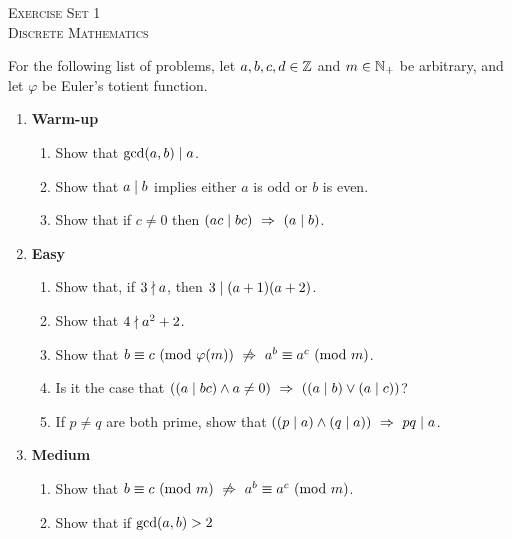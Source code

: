 




\begin{center}
    \textsc{\huge Exercise Set 1}\\
    \textsc{Discrete Mathematics}
\end{center}

For the following list of problems,
let $a, b, c, d \in \mathbb{Z}$ and $m \in \mathbb{N}_+$ be arbitrary,
and let $\varphi$ be Euler's totient function.
\begin{enumerate}
    \item \textbf{Warm-up}
        \begin{enumerate}
            \item
                Show that $\gcd\pn*{a, b} \divides a$.
            \item
                Show that $a \mid b$ implies either $a$ is odd or $b$ is even.
            \item
                Show that if $c \neq 0$ then $\pn*{ac \divides bc} \implies \pn*{a \divides b}$.
        \end{enumerate}
    \item \textbf{Easy}
        \begin{enumerate}
            \item
                Show that, if $3 \nmid a$, then $3 \mid (a + 1)(a + 2)$.
            \item
                Show that $4 \nmid a^2 + 2$.
            \item
                Show that $\modulo{b}{c}{\varphi(m)} \nimplies \modulo{a^b}{a^c}{m}$.
            \item
                Is it the case that $\pn*{\pn*{a \divides bc} \meet a \neq 0} \implies \pn*{\pn*{a \divides b} \join \pn*{a \divides c}}$?
            \item
                If $p \neq q$ are both prime,
                show that $\pn*{\pn*{p \divides a} \meet \pn*{q \divides a}} \implies pq \divides a$.
        \end{enumerate}
    \item \textbf{Medium}
        \begin{enumerate}
            \item
                Show that $\modulo{b}{c}{m} \nimplies \modulo{a^b}{a^c}{m}$.
            \item
                Show that if $\gcd\pn*{a, b} > 2$

\end{enumerate}
\end{enumerate}
